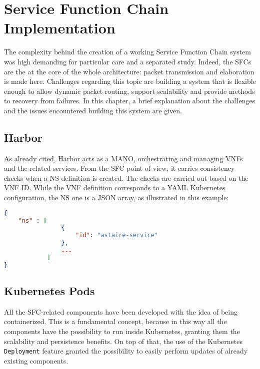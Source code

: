 \chapter{Service Function Chain Implementation} 
\label{chap:vnf_ns_impl}

The complexity behind the creation of a working Service Function Chain system
was high demanding for particular care and a separated study. Indeed, the SFCs
are the at the core of the whole architecture: packet transmission and
elaboration is made here. Challenges regarding this topic are building a system
that is flexible enough to allow dynamic packet routing, support scalability and
provide methods to recovery from failures. In this chapter, a brief explanation
about the challenges and the issues encountered building this system are given.

\section{Harbor}

As already cited, Harbor acts as a MANO, orchestrating and managing VNFs and the
related services. From the SFC point of view, it carries consistency checks when
a NS definition is created. The checks are carried out based on the VNF ID.
While the VNF definition corresponds to a YAML Kubernetes configuration, the NS
one is a JSON array, as illustrated in this example:

\begin{lstlisting}[caption={Example of SFC definition}, captionpos=b,
                   language=json, label=chap:impl:lst:sfcexample]
{
    "ns" : [
                {
                    "id": "astaire-service"
                },
                ...
            ]
}
\end{lstlisting}



\section{Kubernetes Pods}

All the SFC-related components have been developed with the idea of being
containerized. This is a fundamental concept, because in this way all the
components have the possibility to run inside Kubernetes, granting them the
scalability and persistence benefits. On top of that, the use of the Kubernetes
\verb!Deployment! feature granted the possibility to easily perform updates of
already existing components.

